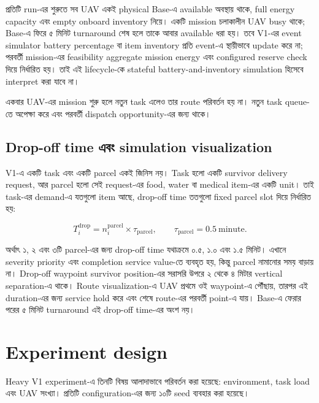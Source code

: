 \documentclass[10pt,a4paper]{article}
\begin{document}
প্রতিটি run-এর শুরুতে সব UAV একই physical Base-এ available অবস্থায় থাকে, full
energy capacity এবং empty onboard inventory নিয়ে। একটি mission চলাকালীন UAV
busy থাকে; Base-এ ফিরে ৫ মিনিট turnaround শেষ হলে তাকে আবার available ধরা হয়।
তবে V1-এর event simulator battery percentage বা item inventory প্রতি event-এ
স্থায়ীভাবে update করে না; পরবর্তী mission-এর feasibility aggregate mission
energy এবং configured reserve check দিয়ে নির্ধারিত হয়। তাই এই lifecycle-কে
stateful battery-and-inventory simulation হিসেবে interpret করা যাবে না।

একবার UAV-এর mission শুরু হলে নতুন task এলেও তার route পরিবর্তন হয় না। নতুন task queue-তে অপেক্ষা করে এবং পরবর্তী dispatch opportunity-এর জন্য থাকে।

\subsection{Drop-off time এবং simulation visualization}

V1-এ একটি task এবং একটি parcel একই জিনিস নয়। Task হলো একটি survivor delivery request, আর parcel হলো সেই request-এর food, water বা medical item-এর একটি unit। তাই task-এর demand-এ যতগুলো item আছে, drop-off time ততগুলো fixed parcel slot দিয়ে নির্ধারিত হয়:

\begin{equation*}
T_i^{\mathrm{drop}} = n_i^{\mathrm{parcel}} \times \tau_{\mathrm{parcel}}, \qquad \tau_{\mathrm{parcel}} = 0.5\ \text{minute}.
\end{equation*}

অর্থাৎ ১, ২ এবং ৩টি parcel-এর জন্য drop-off time যথাক্রমে ০.৫, ১.০ এবং ১.৫ মিনিট। এখানে severity priority এবং completion service value-তে ব্যবহৃত হয়, কিন্তু parcel নামানোর সময় বাড়ায় না। Drop-off waypoint survivor position-এর সরাসরি উপরে ২ থেকে ৪ মিটার vertical separation-এ থাকে। Route visualization-এ UAV প্রথমে ওই waypoint-এ পৌঁছায়, তারপর এই duration-এর জন্য service hold করে এবং শেষে route-এর পরবর্তী point-এ যায়। Base-এ ফেরার পরের ৫ মিনিট turnaround এই drop-off time-এর অংশ নয়।

\section{Experiment design}

Heavy V1 experiment-এ তিনটি বিষয় আলাদাভাবে পরিবর্তন করা হয়েছে: environment, task load এবং UAV সংখ্যা। প্রতিটি configuration-এর জন্য ১০টি seed ব্যবহার করা হয়েছে।
\end{document}
